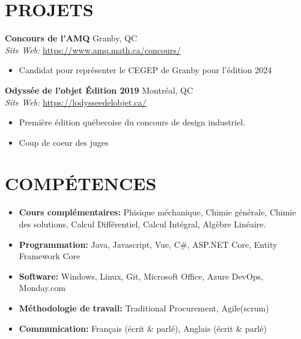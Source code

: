 \documentclass[a4paper,9pt]{extarticle}
\begin{document}
\section*{PROJETS}
\noindent
\textbf{Concours de l'AMQ} \hfill Granby, QC\\ 
\textit{Site Web:} \url{https://www.amq.math.ca/concours/} \hfill 
\begin{itemize}
    \item Candidat pour représenter le CEGEP de Granby pour l'édition 2024
\end{itemize}

\noindent
\textbf{Odyssée de l'objet Édition 2019} \hfill Montréal, QC\\ 
\textit{Site Web:} \url{https://lodysseedelobjet.ca/} \hfill 
\begin{itemize}
    \item Première édition québecoise du concours de design industriel. 
    \item Coup de coeur des juges
\end{itemize}
\vspace{8mm}

\section*{COMPÉTENCES}
\begin{itemize}
    \item \textbf{Cours complémentaires: } Phisique méchanique, Chimie générale, Chimie des solutions, Calcul Différentiel, Calcul Intégral, Algèbre Linéaire. 
    \item \textbf{Programmation:} Java, Javascript, Vue, C\#, ASP.NET Core, Entity Framework Core
    \item \textbf{Software: } Windows, Linux, Git, Microsoft Office, Azure DevOps, Monday.com
    \item \textbf{Méthodologie de travail: } Traditional Procurement, Agile(scrum)
    \item \textbf{Communication:} Français (écrit \& parlé), Anglais (écrit \& parlé) %
\end{itemize}

\end{document}
